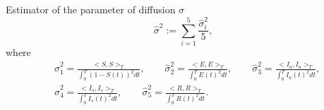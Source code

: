  \begin{frame}{Estimator of the parameter of diffusion $\sigma$}
    \begin{equation*}\label{est_sigma}
        \hat{\sigma}^2:=\sum_{i=1}^5\frac{\hat{\sigma}^2_i}{5},
    \end{equation*}
    where
        \begin{equation*}
            \begin{aligned}
                &\hat{\sigma}^2_1
                  = \frac{<S,S>_T}{\int_0^T(1-S(t))^2dt},
                \qquad
                \hat{\sigma}^2_2
                    = \frac{<E,E>_T}{\int_0^TE(t)^2dt},
                \qquad
                \hat{\sigma}^2_3
                    = \frac{<I_a,I_a>_T}{\int_0^TI_a(t)^2dt},
                \\
                    & \hat{\sigma}^2_4
                    = \frac{<I_s,I_s>_T}{\int_0^TI_s(t)^2dt},
                    \qquad
                    \hat{\sigma}^2_5
                    = \frac{<R,R>_T}{\int_0^TR(t)^2dt}.
            \end{aligned}  
        \end{equation*}
\end{frame}
